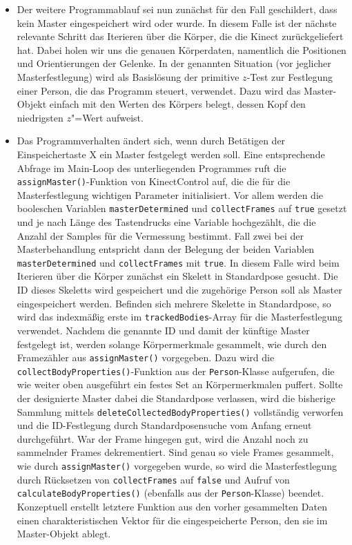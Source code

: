 \begin{itemize}
%
\item Der weitere Programmablauf sei nun zunächst für den Fall geschildert, dass kein Master eingespeichert wird oder wurde. In diesem Falle ist der nächste relevante Schritt das Iterieren über die Körper, die die Kinect zurückgeliefert hat. Dabei holen wir uns die genauen Körperdaten, namentlich die Positionen und Orientierungen der Gelenke. In der genannten Situation (vor jeglicher Masterfestlegung) wird als Basislösung der primitive $z$-Test zur Festlegung einer Person, die das Programm steuert, verwendet. Dazu wird das Master-Objekt einfach mit den Werten des Körpers belegt, dessen Kopf den niedrigsten $z$"=Wert aufweist. 
\item Das Programmverhalten ändert sich, wenn durch Betätigen der Einspeichertaste X ein Master festgelegt werden soll. Eine entsprechende Abfrage im Main-Loop des unterliegenden Programmes ruft die \texttt{assignMaster()}-Funktion von KinectControl auf, die die für die Masterfestlegung wichtigen Parameter initialisiert. Vor allem werden die booleschen Variablen \texttt{masterDetermined} und \texttt{collectFrames} auf \texttt{true} gesetzt und je nach Länge des Tastendrucks eine Variable hochgezählt, die die Anzahl der Samples für die Vermessung bestimmt. Fall zwei bei der Masterbehandlung entspricht dann der Belegung der beiden Variablen \texttt{masterDetermined} und \texttt{collectFrames} mit \texttt{true}. In diesem Falle wird beim Iterieren über die Körper zunächst ein Skelett in Standardpose gesucht. Die ID dieses Skeletts wird gespeichert und die zugehörige Person soll als Master eingespeichert werden. Befinden sich mehrere Skelette in Standardpose, so wird das indexmäßig erste im \texttt{trackedBodies}-Array für die Masterfestlegung verwendet. Nachdem die genannte ID und damit der künftige Master festgelegt ist, werden solange Körpermerkmale gesammelt, wie durch den Framezähler aus \texttt{assignMaster()} vorgegeben. Dazu wird die \texttt{collectBodyProperties()}-Funktion aus der \texttt{Person}-Klasse aufgerufen, die wie weiter oben ausgeführt ein festes Set an Körpermerkmalen puffert. Sollte der designierte Master dabei die Standardpose verlassen, wird die bisherige Sammlung mittels \texttt{deleteCollectedBodyProperties()} vollständig verworfen und die ID-Festlegung durch Standardposensuche vom Anfang erneut durchgeführt. War der Frame hingegen gut, wird die Anzahl noch zu sammelnder Frames dekrementiert. Sind genau so viele Frames gesammelt, wie durch \texttt{assignMaster()} vorgegeben wurde, so wird die Masterfestlegung durch Rücksetzen von \texttt{collectFrames} auf \texttt{false} und Aufruf von \texttt{calculateBodyProperties()} (ebenfalls aus der \texttt{Person}-Klasse) beendet. Konzeptuell erstellt letztere Funktion aus den vorher gesammelten Daten einen charakteristischen Vektor für die eingespeicherte Person, den sie im Master-Objekt ablegt.

\end{itemize}
